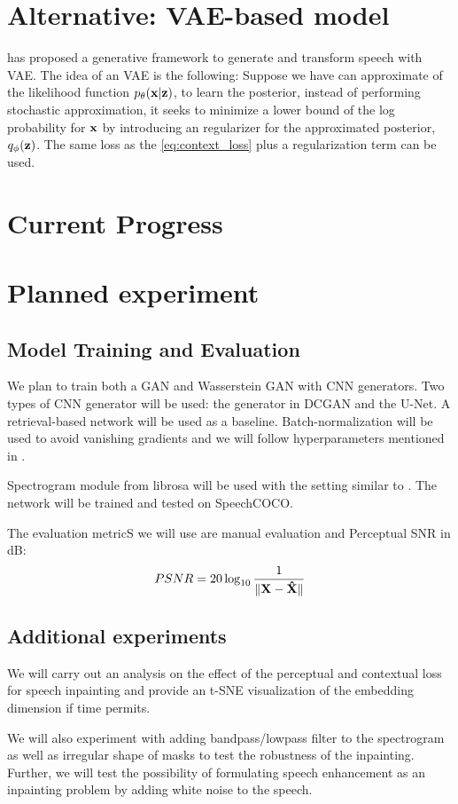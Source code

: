 \documentclass[a4paper]{article}
\begin{document}
\section{Alternative: VAE-based model}
\cite{Hsu17}\cite{Hsu18} has proposed a generative framework to generate and transform speech with VAE.
The idea of an VAE is the following: Suppose we 
have can approximate of the likelihood function
$p_{\theta}(\bf{x}|\bf{z})$, to learn the posterior, instead of performing stochastic approximation,
it seeks to minimize a lower bound of the log
probability for $\bf{x}$ by introducing an regularizer for the
approximated posterior, $q_\phi(\bf{z})$. The same loss as the \ref{eq:context_loss} plus a
regularization term can be used.

\section{Current Progress}

\section{Planned experiment}
\subsection{Model Training and Evaluation}
We plan to train both a GAN and Wasserstein GAN with CNN generators.
Two types of CNN generator will be used: the generator in DCGAN and the U-Net. A retrieval-based network will be used as a baseline. 
Batch-normalization will be used to avoid vanishing gradients and
we will follow hyperparameters mentioned in \cite{Yeh17}.

Spectrogram module from librosa will be used with the setting similar
to \cite{Harwath17}. The network will be trained and tested on 
SpeechCOCO.


The evaluation metricS we will use are manual evaluation and
Perceptual SNR in dB:
\begin{align}
    PSNR = 20 \log_{10} \frac{1}{\lVert \bf{X} - \hat{\bf{X}}\rVert}
\end{align}

\subsection{Additional experiments}
We will carry out an analysis on the effect of the perceptual and 
contextual loss for speech inpainting and provide an t-SNE 
visualization of the embedding dimension if time permits.

We will also experiment with adding bandpass/lowpass filter to
the spectrogram as well as irregular shape of masks to test 
the robustness of the inpainting. Further, we will test the 
possibility of formulating speech enhancement as an inpainting 
problem by adding white noise to the speech.





\end{document}
